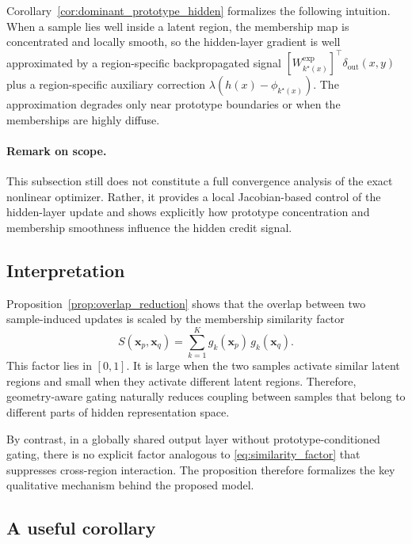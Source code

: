 \documentclass{article}
\theoremstyle{definition}
\theoremstyle{remark}
\begin{document}
Corollary~\ref{cor:dominant_prototype_hidden} formalizes the following
intuition. When a sample lies well inside a latent region, the membership map
is concentrated and locally smooth, so the hidden-layer gradient is well
approximated by a region-specific backpropagated signal
\([W_{k^\star(x)}^{\mathrm{exp}}]^\top\delta_{\mathrm{out}}(x,y)\)
plus a region-specific auxiliary correction
\(\lambda(h(x)-\phi_{k^\star(x)})\).
The approximation degrades only near prototype boundaries or when the
memberships are highly diffuse.

\paragraph{Remark on scope.}
This subsection still does not constitute a full convergence analysis of the exact
nonlinear optimizer. Rather, it provides a local Jacobian-based control of the
hidden-layer update and shows explicitly how prototype concentration and
membership smoothness influence the hidden credit signal.

\subsection{Interpretation}

Proposition~\ref{prop:overlap_reduction} shows that the overlap between two sample-induced updates is scaled by the membership similarity factor
\begin{equation}
S(\mathbf{x}_p,\mathbf{x}_q)
=
\sum_{k=1}^{K} g_k(\mathbf{x}_p)\,g_k(\mathbf{x}_q).
\label{eq:similarity_factor}
\end{equation}
This factor lies in $[0,1]$. It is large when the two samples activate similar latent regions and small when they activate different latent regions. Therefore, geometry-aware gating naturally reduces coupling between samples that belong to different parts of hidden representation space.

By contrast, in a globally shared output layer without prototype-conditioned gating, there is no explicit factor analogous to \eqref{eq:similarity_factor} that suppresses cross-region interaction. The proposition therefore formalizes the key qualitative mechanism behind the proposed model.

\subsection{A useful corollary}
\end{document}
